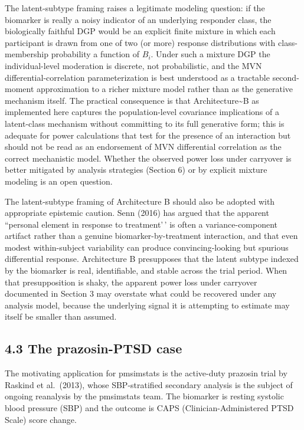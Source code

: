 \documentclass[
]{article}
\begin{document}
The latent-subtype framing raises a legitimate modeling
question: if the biomarker is really a noisy indicator of an
underlying responder class, the biologically faithful DGP would
be an explicit finite mixture in which each participant is drawn
from one of two (or more) response distributions with
class-membership probability a function of \(B_i\). Under such a
mixture DGP the individual-level moderation is discrete, not
probabilistic, and the MVN differential-correlation
parameterization is best understood as a tractable
second-moment approximation to a richer mixture model rather
than as the generative mechanism itself. The practical
consequence is that Architecture\textasciitilde B as implemented here captures
the population-level covariance implications of a latent-class
mechanism without committing to its full generative form; this
is adequate for power calculations that test for the presence
of an interaction but should not be read as an endorsement of
MVN differential correlation as the correct mechanistic model.
Whether the observed power loss under carryover is better
mitigated by analysis strategies (Section 6) or by explicit
mixture modeling is an open question.

The latent-subtype framing of Architecture B should also be
adopted with appropriate epistemic caution. Senn (2016) has
argued that
the apparent ``personal element in response to treatment'\,' is
often a variance-component artifact rather than a genuine
biomarker-by-treatment interaction, and that even modest
within-subject variability can produce convincing-looking but
spurious differential response. Architecture B presupposes that
the latent subtype indexed by the biomarker is real,
identifiable, and stable across the trial period. When that
presupposition is shaky, the apparent power loss under carryover
documented in Section 3 may overstate what could be recovered
under any analysis model, because the underlying signal it is
attempting to estimate may itself be smaller than assumed.

\subsection{4.3 The prazosin-PTSD case}

The motivating application for pmsimstats is the active-duty
prazosin trial by Raskind et al.~(2013), whose SBP-stratified
secondary analysis is the subject of ongoing reanalysis by the
pmsimstats team.
The biomarker is resting systolic blood pressure (SBP) and the
outcome is CAPS (Clinician-Administered PTSD Scale) score
change.
\end{document}
